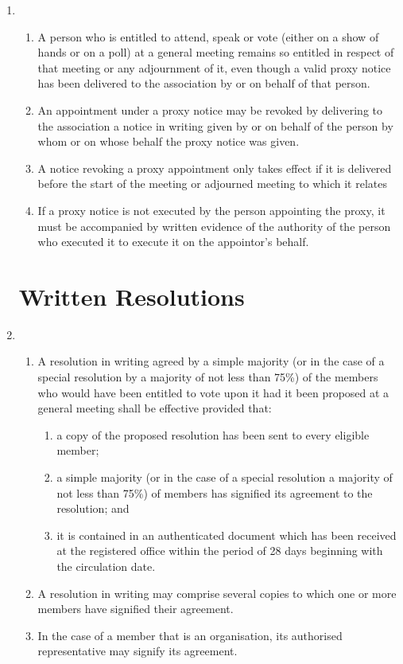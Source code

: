 \begin{enumerate}
\item
    \begin{enumerate}
        \item
        A person who is entitled to attend, speak or vote
        (either on a show of hands or on a poll) at a general meeting
        remains so entitled in respect of that meeting or any adjournment
        of it, even though a valid proxy notice has been delivered to the
        association by or on behalf of that person.
        \item
        An appointment under a
        proxy notice may be revoked by delivering to the association a notice
        in writing given by or on behalf of the person by whom or on whose
        behalf the proxy notice was given.
        \item
        A notice revoking a proxy
        appointment only takes effect if it is delivered before the start
        of the meeting or adjourned meeting to which it relates
        \item
        If a
        proxy notice is not executed by the person appointing the proxy, it
        must be accompanied by written evidence of the authority of the
        person who executed it to execute it on the appointor's behalf.
    \end{enumerate}

\section{Written Resolutions}

\item
  \begin{enumerate}
  \item
    A resolution in writing agreed by a simple majority (or in the case
    of a special resolution by a majority of not less than 75\%) of the
    members who would have been entitled to vote upon it had it been
    proposed at a general meeting shall be effective provided that:
    \begin{enumerate}
    \item
      a copy of the proposed resolution has been sent to every eligible
      member;
    \item
      a simple majority (or in the case of a special resolution a
      majority of not less than 75\%) of members has signified its
      agreement to the resolution; and
    \item
      it is contained in an authenticated document which has been
      received at the registered office within the period of 28 days
      beginning with the circulation date.
    \end{enumerate}
  \item
    A resolution in writing may comprise several copies to which one or
    more members have signified their agreement.
  \item
    In the case of a member that is an organisation, its authorised
    representative may signify its agreement.
  \end{enumerate}


\end{enumerate}
